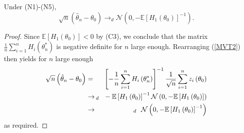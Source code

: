 \documentclass[notes=show]{beamer}
\begin{document}
\begin{frame}%


\begin{theorem}
Under (N1)-(N5),%
\begin{equation*}
\sqrt{n}\left( \hat{\theta}_{n}-\theta _{0}\right) \rightarrow _{d}\mathcal{N%
}\left( 0,-\mathbb{E}\left[ H_{1}\left( \theta _{0}\right) \right]
^{-1}\right) .
\end{equation*}
\end{theorem}

\end{frame}%

\begin{frame}%


\begin{proof}
Since $\mathbb{E}\left[ H_{1}\left( \theta _{0}\right) \right] <0$ by (C3),
we conclude that the matrix $\frac{1}{n}\sum_{i=1}^{n}H_{i}\left( \theta
_{n}^{\ast }\right) $ is negative definite for $n$ large enough. Rearranging
(\ref{MVT2}) then yields for $n$ large enough%
\begin{eqnarray*}
\sqrt{n}\left( \hat{\theta}_{n}-\theta _{0}\right) &=&\left[ -\frac{1}{n}%
\sum_{i=1}^{n}H_{i}\left( \theta _{n}^{\ast }\right) \right] ^{-1}\frac{1}{%
\sqrt{n}}\sum_{i=1}^{n}z_{i}\left( \theta _{0}\right) \\
&\rightarrow &\!\!\!\!\!_{d}\text{ \ }-\mathbb{E}\left[ H_{1}\left( \theta
_{0}\right) \right] ^{-1}\mathcal{N}\left( 0,-\mathbb{E}\left[ H_{1}\left(
\theta _{0}\right) \right] \right) \\
&\rightarrow &\!\!\!\!\!_{d}\text{ \ }\mathcal{N}\left( 0,-\mathbb{E}\left[
H_{1}\left( \theta _{0}\right) \right] ^{-1}\right)
\end{eqnarray*}%
as required.
\end{proof}

\end{frame}%
\end{document}
